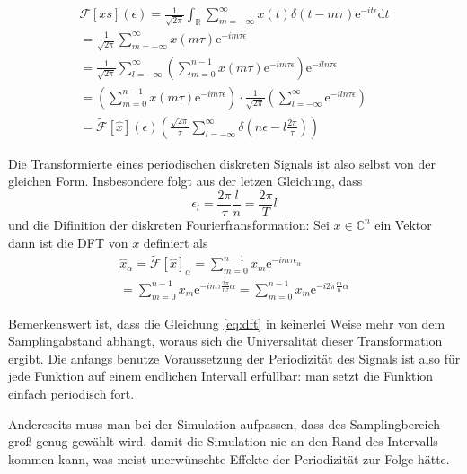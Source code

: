 \documentclass[10pt,a4paper,german]{scrartcl}
\begin{document}
		\begin{multline*}
			\mathcal{F}[x s](\epsilon) 
				= \frac{1}{\sqrt{2 \pi}}\int_{\mathbb{R}}{
					 \sum_{m=-\infty}^{\infty} x(t)\delta(t-m\tau)
						 \mathrm{e}^{- i t \epsilon}
					 \mathrm{d}t }\\
				= \frac{1}{\sqrt{2 \pi}}
				  \sum_{m=-\infty}^{\infty} x(m\tau) \mathrm{e}^{- i m \tau \epsilon} \\
  			= \frac{1}{\sqrt{2 \pi}} \sum_{l=-\infty}^{\infty}
					 \left(\sum_{m=0}^{n-1} x(m\tau) \mathrm{e}^{- i m \tau \epsilon}\right)
					  \mathrm{e}^{- i l n \tau \epsilon}\\
				= \left(\sum_{m=0}^{n-1} x(m\tau) \mathrm{e}^{- i m \tau \epsilon}\right)
				  \cdot \frac{1}{\sqrt{2 \pi}}
				  \left( \sum_{l=-\infty}^{\infty} \mathrm{e}^{- i l n \tau \epsilon} \right) \\
				= \tilde{\mathcal{F}}[\hat{x}](\epsilon)
					\left(\frac{\sqrt{2\pi}}{\tau}
				  	\sum_{l=-\infty}^{\infty} \delta\left(
				  	  n \epsilon - l \frac{2\pi}{\tau}
				  	\right)
				  \right)
		\end{multline*}
		
		Die Transformierte eines periodischen diskreten Signals ist also selbst
		von der gleichen Form. Insbesondere folgt aus der letzen Gleichung, dass
		\begin{equation}
			\epsilon_l = \frac{2\pi}{\tau}\frac{l}{n} = \frac{2\pi}{T} l
		\end{equation}
		und die Difinition der diskreten Fourierfransformation:
		Sei $x \in \mathbb{C}^n$ ein Vektor dann ist die DFT von $x$ definiert
		als
		\begin{multline}
		\label{eq:dft}
			\hat{x}_\alpha
			= \tilde{\mathcal{F}}[\hat{x}]_\alpha 
			= \sum_{m=0}^{n-1} x_m \mathrm{e}^{- i m \tau \epsilon_\alpha}\\
			= \sum_{m=0}^{n-1} x_m \mathrm{e}^{- i m \tau  \frac{2\pi}{n\tau} \alpha}
			= \sum_{m=0}^{n-1} x_m \mathrm{e}^{- i 2\pi \frac{m}{n} \alpha}
		\end{multline}
		
		Bemerkenswert ist, dass die Gleichung \eqref{eq:dft} in keinerlei Weise
		mehr von dem Samplingabstand abhängt, woraus sich die Universalität
		dieser Transformation ergibt. Die anfangs benutze Voraussetzung der
		Periodizität des Signals ist also für jede Funktion auf einem endlichen
		Intervall erfüllbar: man setzt die Funktion einfach periodisch fort.
		
		Andereseits muss man bei der Simulation aufpassen, dass des Samplingbereich
		groß genug gewählt wird, damit die Simulation nie an den Rand des Intervalls
		kommen kann, was meist unerwünschte Effekte der Periodizität zur Folge hätte.
\end{document}
